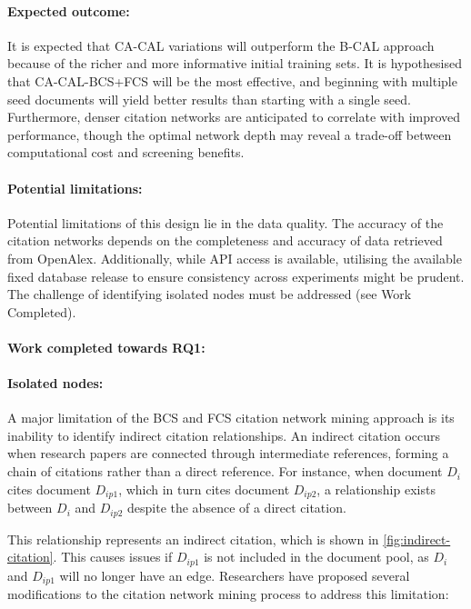 \documentclass[10pt,oneside]{book}
\begin{document}
\paragraph{Expected outcome: } It is expected that CA-CAL variations will outperform the B-CAL approach because of the richer and more informative initial training sets. It is hypothesised that CA-CAL-BCS+FCS will be the most effective, and beginning with multiple seed documents will yield better results than starting with a single seed. Furthermore, denser citation networks are anticipated to correlate with improved performance, though the optimal network depth may reveal a trade-off between computational cost and screening benefits.


\paragraph{Potential limitations: } Potential limitations of this design lie in the data quality. The accuracy of the citation networks depends on the completeness and accuracy of data retrieved from OpenAlex. Additionally, while API access is available, utilising the available fixed database release to ensure consistency across experiments might be prudent. The challenge of identifying isolated nodes must be addressed (see Work Completed).

\paragraph{Work completed towards RQ1:}

\paragraph{Isolated nodes:}

A major limitation of the BCS and FCS citation network mining approach is its inability to identify indirect citation relationships. An indirect citation occurs when research papers are connected through intermediate references, forming a chain of citations rather than a direct reference. For instance, when document $D_i$ cites document $D_{ip1}$, which in turn cites document $D_{ip2}$, a relationship exists between $D_i$ and $D_{ip2}$ despite the absence of a direct citation. 

This relationship represents an indirect citation, which is shown in \ref{fig:indirect-citation}. This causes issues if $D_{ip1}$ is not included in the document pool, as $D_i$ and $D_{ip1}$ will no longer have an edge. Researchers have proposed several modifications to the citation network mining process to
address this limitation:
\end{document}
